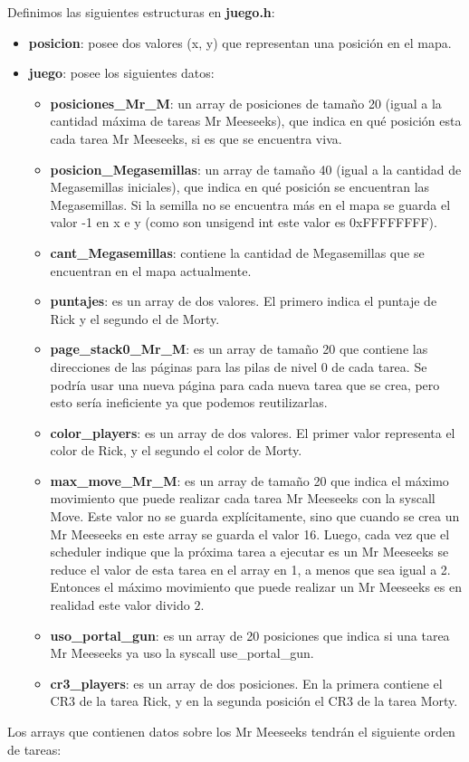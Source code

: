 \documentclass[a4paper]{article}
\begin{document}
\justify
Definimos las siguientes estructuras en \textbf{juego.h}:
\begin{itemize}
	\item \textbf{posicion}: posee dos valores (x, y) que representan una posición en el mapa.
	\item \textbf{juego}: posee los siguientes datos:
	\begin{itemize}
		\item \textbf{posiciones_Mr_M}: un array de posiciones de tamaño 20 (igual a la cantidad máxima de tareas Mr Meeseeks), que indica en qué posición esta cada tarea Mr Meeseeks, si es que se encuentra viva.
		\item \textbf{posicion_Megasemillas}: un array de tamaño 40 (igual a la cantidad de Megasemillas iniciales), que indica en qué posición se encuentran las Megasemillas. Si la semilla no se encuentra más en el mapa se guarda el valor -1 en x e y (como son unsigend int este valor es 0xFFFFFFFF).
		\item \textbf{cant_Megasemillas}: contiene la cantidad de Megasemillas que se encuentran en el mapa actualmente.
		\item \textbf{puntajes}: es un array de dos valores. El primero indica el puntaje de Rick y el segundo el de Morty.
		\item \textbf{page_stack0_Mr_M}: es un array de tamaño 20 que contiene las direcciones de las páginas para las pilas de nivel 0 de cada tarea. Se podría usar una nueva página para cada nueva tarea que se crea, pero esto sería ineficiente ya que podemos reutilizarlas.
		\item \textbf{color_players}: es un array de dos valores. El primer valor representa el color de Rick, y el segundo el color de Morty.
		\item \textbf{max_move_Mr_M}: es un array de tamaño 20 que  indica el máximo movimiento que puede realizar cada tarea Mr Meeseeks con la syscall Move. Este valor no se guarda explícitamente, sino que cuando se crea un Mr Meeseeks en este array se guarda el valor 16. Luego, cada vez que el scheduler indique que la próxima tarea a ejecutar es un Mr Meeseeks se reduce el valor de esta tarea en el array en 1, a menos que sea igual a 2. Entonces el máximo movimiento que puede realizar un Mr Meeseeks es en realidad este valor divido $2$.
		\item \textbf{uso_portal_gun}: es un array de 20 posiciones que indica si una tarea Mr Meeseeks ya uso la syscall use_portal_gun.
		\item \textbf{cr3_players}: es un array de dos posiciones. En la primera contiene el CR3 de la tarea Rick, y en la segunda posición el CR3 de la tarea Morty.
	\end{itemize}
\end{itemize}
Los arrays que contienen datos sobre los Mr Meeseeks tendrán el siguiente orden de tareas:
\end{document}
